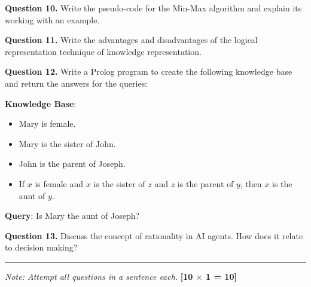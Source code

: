 \documentclass[11pt,a4paper]{article}
\begin{document}
\medskip\noindent\textbf{Question 10.} Write the pseudo-code for the Min-Max algorithm and explain its working with an example.

\medskip\noindent\textbf{Question 11.} Write the advantages and disadvantages of the logical representation technique of knowledge representation.

\medskip\noindent\textbf{Question 12.} Write a Prolog program to create the following knowledge base and return the answers for the queries:
\begin{parts}
  \item \textbf{Knowledge Base}:
  \begin{itemize}
    \item Mary is female.
    \item Mary is the sister of John.
    \item John is the parent of Joseph.
    \item If $x$ is female and $x$ is the sister of $z$ and $z$ is the parent of $y$, then $x$ is the aunt of $y$.
  \end{itemize}
  \item \textbf{Query}: Is Mary the aunt of Joseph?
\end{parts}

\medskip\noindent\textbf{Question 13.} Discuss the concept of rationality in AI agents. How does it relate to decision making?

\bigskip{}
\rule{\linewidth}{0.4pt}\smallskip

\noindent\textit{Note: Attempt all questions in a sentence each.} \hfill \textbf{[10 $\times$ 1 = 10]}
\end{document}
